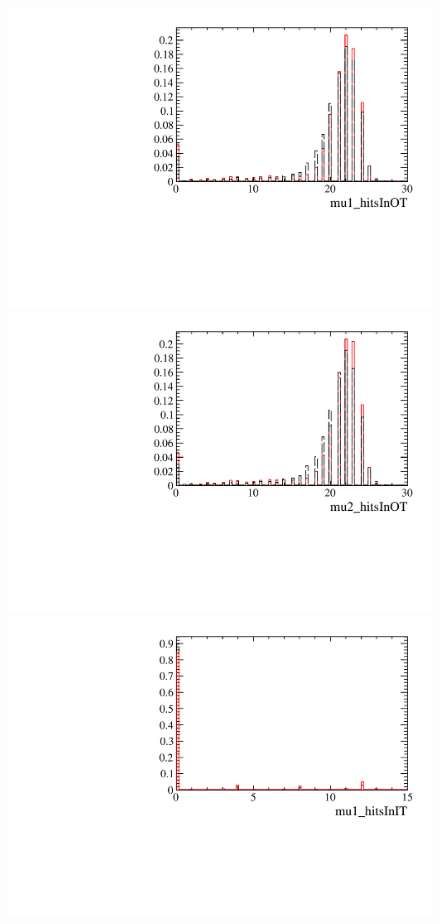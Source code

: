 \begin{figure} [htb!]
\begin{center}
\includegraphics[scale=0.20]{figs/mu1_hitsInOTFULL.pdf}
\includegraphics[scale=0.20]{figs/mu2_hitsInOTFULL.pdf}
\includegraphics[scale=0.20]{figs/mu1_hitsInITFULL.pdf}

\end{center}
\end{figure}
